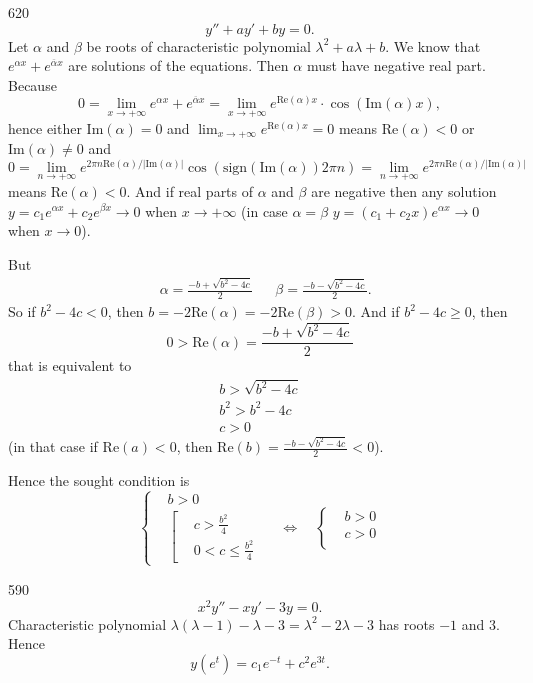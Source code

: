 \documentclass[12pt,a4paper]{article}
\renewcommand{\Re}{\mathrm{Re}}
\renewcommand{\Im}{\mathrm{Im}}
\newcommand{\sign}{\mathrm{sign}}
\begin{document}
    \begin{problem}{620}
        \[y'' + ay' + by = 0.\]
        Let $\alpha$ and $\beta$ be roots of characteristic polynomial $\lambda^2 + a\lambda + b$. We know that $e^{\alpha x} + e^{\overline{\alpha} x}$ are solutions of the equations. Then $\alpha$ must have negative real part. Because
        \[0 = \lim_{x \to + \infty} e^{\alpha x} + e^{\overline{\alpha} x} = \lim_{x \to + \infty} e^{\Re(\alpha)x} \cdot \cos(\Im(\alpha) x),\]
        hence either $\Im(\alpha) = 0$ and $\lim_{x \to +\infty} e^{\Re(\alpha)x} = 0$ means $\Re(\alpha) < 0$ or $\Im(\alpha) \neq 0$ and
        \[
            0
            = \lim_{n \to +\infty} e^{2 \pi n\Re(\alpha)/|\Im(\alpha)|} \cos(\sign(\Im(\alpha))2\pi n)
            = \lim_{n \to +\infty} e^{2 \pi n\Re(\alpha)/|\Im(\alpha)|}
        \]
        means $\Re(\alpha) < 0$. And if real parts of $\alpha$ and $\beta$ are negative then any solution $y = c_1 e^{\alpha x} + c_2 e^{\beta x} \to 0$ when $x \to + \infty$ (in case $\alpha = \beta$ $y = (c_1 + c_2x) e^{\alpha x} \to 0$ when $x \to 0$).

        But
        \begin{align*}
            &\alpha = \frac{-b + \sqrt{b^2 - 4c}}{2}&
            &\beta = \frac{-b - \sqrt{b^2 - 4c}}{2}.
        \end{align*}
        So if $b^2 - 4c < 0$, then $b = -2\Re(\alpha) = -2\Re(\beta) > 0$. And if $b^2 - 4c \geqslant 0$, then
        \[0 > \Re(\alpha) = \frac{-b + \sqrt{b^2 - 4c}}{2}\]
        that is equivalent to
        \begin{gather*}
            b > \sqrt{b^2 - 4c}\\
            b^2 > b^2 - 4c\\
            c > 0
        \end{gather*}
        (in that case if $\Re(a) < 0$, then $\Re(b) = \frac{-b - \sqrt{b^2 - 4c}}{2} < 0$).

        Hence the sought condition is
        \[
            \left\{
                \begin{aligned}
                    &b > 0\\
                    &\left[
                        \begin{aligned}
                            &c > \frac{b^2}{4}\\
                            &0 < c \leqslant \frac{b^2}{4}
                        \end{aligned}
                    \right.
                \end{aligned}
            \right.
            \quad \Longleftrightarrow \quad
            \left\{
                \begin{aligned}
                    &b > 0\\
                    &c > 0\\
                \end{aligned}
            \right.
        \]
    \end{problem}

    \begin{problem}{590}
        \[x^2 y'' - x y' - 3y = 0.\]
        Characteristic polynomial $\lambda(\lambda - 1) - \lambda - 3 = \lambda^2 - 2\lambda - 3$ has roots $-1$ and $3$. Hence
        \[y(e^t) = c_1 e^{-t} + c^2 e^{3t}.\]
    \end{problem}
\end{document}
